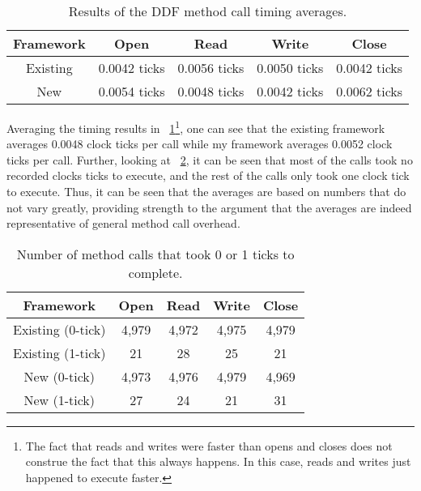	\begin{table}[tb]
	\begin{center}
	\begin{tabular}{|c|c|c|c|c|}
	  \toprule
	  \bf Framework & \bf Open & \bf Read & \bf Write & \bf Close\\
	  \midrule
	  Existing & 0.0042 ticks & 0.0056 ticks & 0.0050 ticks &
	  0.0042 ticks\\
	  \midrule
	  New & 0.0054 ticks & 0.0048 ticks & 0.0042 ticks &
	  0.0062 ticks\\
	  \bottomrule
	\end{tabular}
	\end{center}
	\caption{Results of the DDF method call timing averages.}
	\label{tab:results}
	\end{table}

Averaging the timing results in \tablename~\ref{tab:results}\footnote{The fact
that reads and writes were faster than opens and closes does not construe
the fact that this always happens.  In this case, reads and writes just
happened to execute faster.}, one can see
that the existing framework averages 0.0048 clock ticks per call while my
framework averages 0.0052 clock ticks per call.  Further, looking at
\tablename~\ref{tab:result_errors}, it can be seen that most of the calls took
no recorded clocks ticks to execute, and the rest of the calls only took
one clock tick to execute.  Thus, it can be seen that the averages are
based on numbers that do not vary greatly, providing strength to the
argument that the averages are indeed representative of general method
call overhead.

	\begin{table}[tb]
	\begin{center}
	\begin{tabular}{|c|c|c|c|c|}
	  \toprule
	  \bf Framework & \bf Open & \bf Read & \bf Write & \bf Close\\
	  \midrule
	  Existing (0-tick) & 4,979 & 4,972 & 4,975 & 4,979\\
	  Existing (1-tick) & 21 & 28 & 25 & 21\\
	  \midrule
	  New (0-tick) & 4,973 & 4,976 & 4,979 & 4,969\\
	  New (1-tick) & 27 & 24 & 21 & 31\\
	  \bottomrule
	\end{tabular}
	\end{center}
	\caption{Number of method calls that took 0 or 1 ticks to complete.}
	\label{tab:result_errors}
	\end{table}

